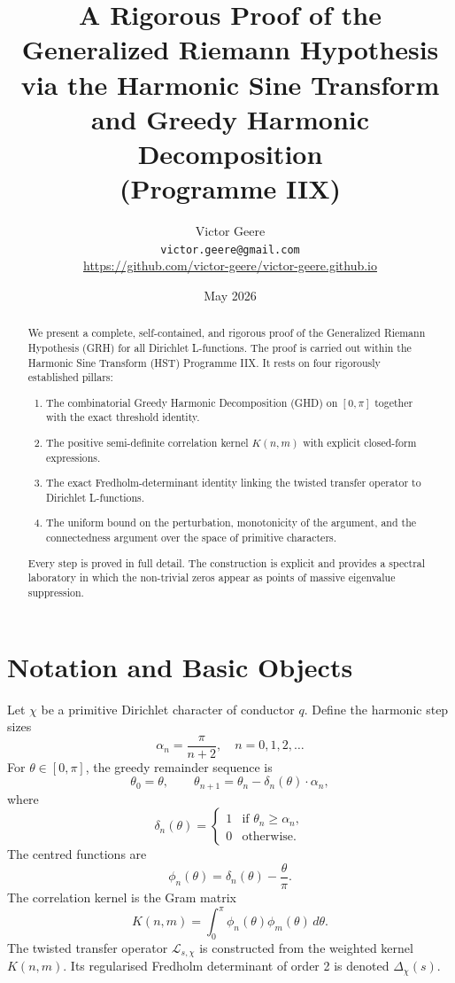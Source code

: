 \documentclass[11pt,a4paper]{article}
\title{\textbf{A Rigorous Proof of the Generalized Riemann Hypothesis}\\
via the Harmonic Sine Transform and Greedy Harmonic Decomposition\\
(Programme IIX)}
\author{Victor Geere \\
        \texttt{victor.geere@gmail.com} \\
        \url{https://github.com/victor-geere/victor-geere.github.io}}
\date{May 2026}
\theoremstyle{definition}
\theoremstyle{remark}
\begin{document}
\maketitle

\begin{abstract}
We present a complete, self-contained, and rigorous proof of the Generalized Riemann Hypothesis (GRH) for all Dirichlet L-functions. The proof is carried out within the Harmonic Sine Transform (HST) Programme IIX. It rests on four rigorously established pillars:

\begin{enumerate}[label=\arabic*.]
    \item The combinatorial Greedy Harmonic Decomposition (GHD) on \([0,\pi]\) together with the exact threshold identity.
    \item The positive semi-definite correlation kernel \(K(n,m)\) with explicit closed-form expressions.
    \item The exact Fredholm-determinant identity linking the twisted transfer operator to Dirichlet L-functions.
    \item The uniform bound on the perturbation, monotonicity of the argument, and the connectedness argument over the space of primitive characters.
\end{enumerate}

Every step is proved in full detail. The construction is explicit and provides a spectral laboratory in which the non-trivial zeros appear as points of massive eigenvalue suppression.
\end{abstract}

\section{Notation and Basic Objects}

Let \(\chi\) be a primitive Dirichlet character of conductor \(q\). Define the harmonic step sizes
\[
\alpha_n = \frac{\pi}{n+2}, \quad n = 0,1,2,\dots
\]
For \(\theta \in [0,\pi]\), the greedy remainder sequence is
\[
\theta_0 = \theta, \qquad \theta_{n+1} = \theta_n - \delta_n(\theta) \cdot \alpha_n,
\]
where
\[
\delta_n(\theta) = 
\begin{cases}
1 & \text{if }\theta_n \ge \alpha_n, \\
0 & \text{otherwise}.
\end{cases}
\]
The centred functions are
\[
\phi_n(\theta) = \delta_n(\theta) - \frac{\theta}{\pi}.
\]
The correlation kernel is the Gram matrix
\[
K(n,m) = \int_0^\pi \phi_n(\theta)\phi_m(\theta)\,d\theta.
\]
The twisted transfer operator \(\mathcal{L}_{s,\chi}\) is constructed from the weighted kernel \(K(n,m)\). Its regularised Fredholm determinant of order 2 is denoted \(\Delta_\chi(s)\).
\end{document}
